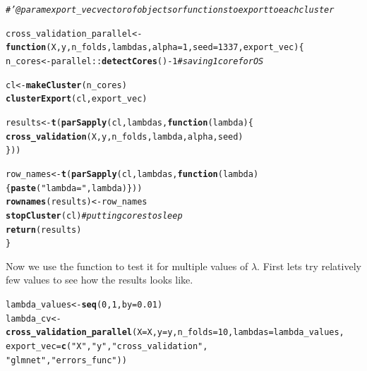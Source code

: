 \documentclass[11pt, a4paper, english]{article}\usepackage[]{graphicx}\usepackage[dvipsnames]{xcolor}
\makeatletter
\newcommand{\hlnum}[1]{\textcolor[rgb]{0.686,0.059,0.569}{#1}}%
\newcommand{\hlstr}[1]{\textcolor[rgb]{0.192,0.494,0.8}{#1}}%
\newcommand{\hlcom}[1]{\textcolor[rgb]{0.678,0.584,0.686}{\textit{#1}}}%
\newcommand{\hlopt}[1]{\textcolor[rgb]{0,0,0}{#1}}%
\newcommand{\hlstd}[1]{\textcolor[rgb]{0.345,0.345,0.345}{#1}}%
\newcommand{\hlkwa}[1]{\textcolor[rgb]{0.161,0.373,0.58}{\textbf{#1}}}%
\newcommand{\hlkwb}[1]{\textcolor[rgb]{0.69,0.353,0.396}{#1}}%
\newcommand{\hlkwc}[1]{\textcolor[rgb]{0.333,0.667,0.333}{#1}}%
\newcommand{\hlkwd}[1]{\textcolor[rgb]{0.737,0.353,0.396}{\textbf{#1}}}%
\newenvironment{kframe}{%
 \def\at@end@of@kframe{}%
 \ifinner\ifhmode%
  \def\at@end@of@kframe{\end{minipage}}%
  \begin{minipage}{\columnwidth}%
 \fi\fi%
 \def\FrameCommand##1{\hskip\@totalleftmargin \hskip-\fboxsep
 \colorbox{shadecolor}{##1}\hskip-\fboxsep
     \hskip-\linewidth \hskip-\@totalleftmargin \hskip\columnwidth}%
 \MakeFramed {\advance\hsize-\width
   \@totalleftmargin\z@ \linewidth\hsize
   \@setminipage}}%
 {\par\unskip\endMakeFramed%
 \at@end@of@kframe}
\newenvironment{knitrout}{}{} %
\makeatother
\begin{document}
\begin{knitrout}
\color{fgcolor}\begin{kframe}
\begin{alltt}
\hlcom{#' @param export_vec vector of objects or functions to export to each cluster}

\hlstd{cross_validation_parallel} \hlkwb{<-} \hlkwa{function}\hlstd{(}\hlkwc{X}\hlstd{,} \hlkwc{y}\hlstd{,} \hlkwc{n_folds}\hlstd{,} \hlkwc{lambdas}\hlstd{,} \hlkwc{alpha}\hlstd{=}\hlnum{1}\hlstd{,} \hlkwc{seed}\hlstd{=}\hlnum{1337}\hlstd{,} \hlkwc{export_vec}\hlstd{)\{}
  \hlstd{n_cores} \hlkwb{<-} \hlstd{parallel}\hlopt{::}\hlkwd{detectCores}\hlstd{()}\hlopt{-} \hlnum{1} \hlcom{#saving 1 core for OS }

  \hlstd{cl} \hlkwb{<-} \hlkwd{makeCluster}\hlstd{(n_cores)}
  \hlkwd{clusterExport}\hlstd{(cl, export_vec)}

  \hlstd{results} \hlkwb{<-} \hlkwd{t}\hlstd{(}\hlkwd{parSapply}\hlstd{(cl, lambdas,} \hlkwa{function}\hlstd{(}\hlkwc{lambda}\hlstd{) \{}
    \hlkwd{cross_validation}\hlstd{(X, y, n_folds, lambda, alpha, seed)}
  \hlstd{\}))}


  \hlstd{row_names} \hlkwb{<-} \hlkwd{t}\hlstd{(}\hlkwd{parSapply}\hlstd{(cl, lambdas,} \hlkwa{function}\hlstd{(}\hlkwc{lambda}\hlstd{)\{}\hlkwd{paste}\hlstd{(}\hlstr{"lambda = "}\hlstd{, lambda)\}))}
  \hlkwd{rownames}\hlstd{(results)} \hlkwb{<-} \hlstd{row_names}
  \hlkwd{stopCluster}\hlstd{(cl)} \hlcom{#putting cores to sleep}
  \hlkwd{return}\hlstd{(results)}
\hlstd{\}}
\end{alltt}
\end{kframe}
\end{knitrout}
Now we use the function to test it for multiple values of $\lambda$. 
First lets try relatively few values to see how the results looks like.
\begin{knitrout}
\color{fgcolor}\begin{kframe}
\begin{alltt}
\hlstd{lambda_values} \hlkwb{<-} \hlkwd{seq}\hlstd{(}\hlnum{0}\hlstd{,}\hlnum{1}\hlstd{,} \hlkwc{by}\hlstd{=}\hlnum{0.01}\hlstd{)}
\hlstd{lambda_cv} \hlkwb{<-} \hlkwd{cross_validation_parallel}\hlstd{(}\hlkwc{X}\hlstd{=X,} \hlkwc{y}\hlstd{=y,} \hlkwc{n_folds}\hlstd{=}\hlnum{10}\hlstd{,} \hlkwc{lambdas}\hlstd{=lambda_values,}
                          \hlkwc{export_vec} \hlstd{=} \hlkwd{c}\hlstd{(}\hlstr{"X"}\hlstd{,} \hlstr{"y"}\hlstd{,} \hlstr{"cross_validation"}\hlstd{,}
                                         \hlstr{"glmnet"}\hlstd{,} \hlstr{"errors_func"}\hlstd{) )}
\end{alltt}
\end{kframe}
\end{knitrout}
\end{document}
